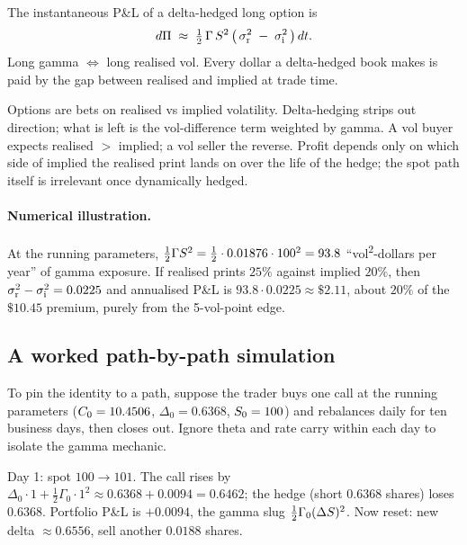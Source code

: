 \begin{keyfactbox}
The instantaneous P\&L of a delta-hedged long option is
\begin{equation}
  d\Pi \;\approx\; \tfrac12\,\Gamma\,S^2\,
                   \bigl(\,\sigma_{\text{r}}^2 \;-\; \sigma_{\text{i}}^2\,\bigr)\,dt.
  \label{eq:vol_trading_eq}
\end{equation}
Long gamma $\Leftrightarrow$ long realised vol. Every dollar a
delta-hedged book makes is paid by the gap between realised and
implied at trade time.
\end{keyfactbox}

\begin{intuitionbox}
Options are bets on realised vs implied volatility. Delta-hedging
strips out direction; what is left is the vol-difference term
weighted by gamma. A vol buyer expects realised $>$ implied; a
vol seller the reverse. Profit depends only on which side of
implied the realised print lands on over the life of the hedge;
the spot path itself is irrelevant once dynamically hedged.
\end{intuitionbox}

\paragraph{Numerical illustration.}
At the running parameters, $\tfrac12 \Gamma S^2 = \tfrac12 \cdot
0.01876 \cdot 100^2 = 93.8$ ``vol\textsuperscript{2}-dollars per
year'' of gamma exposure. If realised prints $25\%$ against implied
$20\%$, then $\sigma_{\text{r}}^2 - \sigma_{\text{i}}^2 = 0.0225$
and annualised P\&L is $93.8 \cdot 0.0225 \approx \$2.11$, about
$20\%$ of the $\$10.45$ premium, purely from the 5-vol-point
edge.

\subsection{A worked path-by-path simulation}
\label{subsec:ch16_path_simulation}

To pin the identity to a path, suppose the trader buys one call at
the running parameters ($C_0 = 10.4506$, $\Delta_0 = 0.6368$,
$S_0 = 100$) and rebalances daily for ten business days, then
closes out. Ignore theta and rate carry within each day to isolate
the gamma mechanic.

Day 1: spot $100 \to 101$. The call rises by $\Delta_0 \cdot 1 +
\tfrac12 \Gamma_0 \cdot 1^2 \approx 0.6368 + 0.0094 = 0.6462$; the
hedge (short $0.6368$ shares) loses $0.6368$. Portfolio P\&L is
$+0.0094$, the gamma slug $\tfrac12 \Gamma_0 (\Delta S)^2$.
Now reset: new delta $\approx 0.6556$, sell another $0.0188$
shares.

